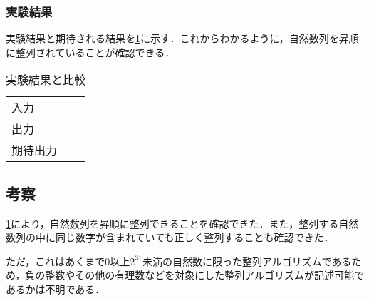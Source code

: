 \subsubsection{実験結果}
実験結果と期待される結果を\ref{tbl:execute}に示す．これからわかるように，自然数列を昇順に整列されていることが確認できる．
\begin{table}[h]
    \centering
    \caption{実験結果と比較}
    \label{tbl:execute}
    \begin{tabular}{l|ll}
        入力   \\
        出力   \\
        期待出力 \\
    \end{tabular}
\end{table}
\subsection{考察}
\ref{tbl:execute}により，自然数列を昇順に整列できることを確認できた．また，整列する自然数列の中に同じ数字が含まれていても正しく整列することも確認できた．\par
ただ，これはあくまで\(0\)以上\(2^{31}\)未満の自然数に限った整列アルゴリズムであるため，負の整数やその他の有理数などを対象にした整列アルゴリズムが記述可能であるかは不明である．